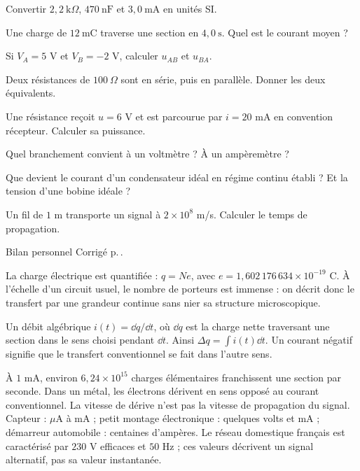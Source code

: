 
\begin{questions}
\item Convertir $2{,}2\ \mathrm{k}\Omega$, $470\ \mathrm{nF}$ et $3{,}0\ \mathrm{mA}$ en unités SI.
\item Une charge de $12\ \mathrm{mC}$ traverse une section en $4{,}0\ \mathrm{s}$. Quel est le courant moyen ?
\item Si $V_A=5$ V et $V_B=-2$ V, calculer $u_{AB}$ et $u_{BA}$.
\item Deux résistances de $100\ \Omega$ sont en série, puis en parallèle. Donner les deux équivalents.
\item Une résistance reçoit $u=6$ V et est parcourue par $i=20$ mA en convention récepteur. Calculer sa puissance.
\item Quel branchement convient à un voltmètre ? À un ampèremètre ?
\item Que devient le courant d’un condensateur idéal en régime continu établi ? Et la tension d’une bobine idéale ?
\item Un fil de $1$ m transporte un signal à $2\times10^8$ m/s. Calculer le temps de propagation.
\end{questions}
\begin{docu}{Bilan personnel}
Corrigé p.\,\pageref{corr-diag}.
\end{docu}


La charge électrique est quantifiée : $q=Ne$, avec $e=1{,}602\,176\,634\times10^{-19}$ C. À l’échelle d’un circuit usuel, le nombre de porteurs est immense : on décrit donc le transfert par une grandeur continue sans nier sa structure microscopique.
\begin{loi}{Un débit algébrique}
$i(t)=\dd q/\dd t$, où $\dd q$ est la charge nette traversant une section dans le sens choisi pendant $\dd t$. Ainsi $\Delta q=\int i(t)\dd t$. Un courant négatif signifie que le transfert conventionnel se fait dans l’autre sens.
\end{loi}
À $1$ mA, environ $6{,}24\times10^{15}$ charges élémentaires franchissent une section par seconde. Dans un métal, les électrons dérivent en sens opposé au courant conventionnel. La vitesse de dérive n’est pas la vitesse de propagation du signal.
Capteur : $\mu\mathrm{ A}$ à $\mathrm{mA}$ ; petit montage électronique : quelques volts et $\mathrm{mA}$ ; démarreur automobile : centaines d’ampères. Le réseau domestique français est caractérisé par $230$ V efficaces et $50$ Hz ; ces valeurs décrivent un signal alternatif, pas sa valeur instantanée.


